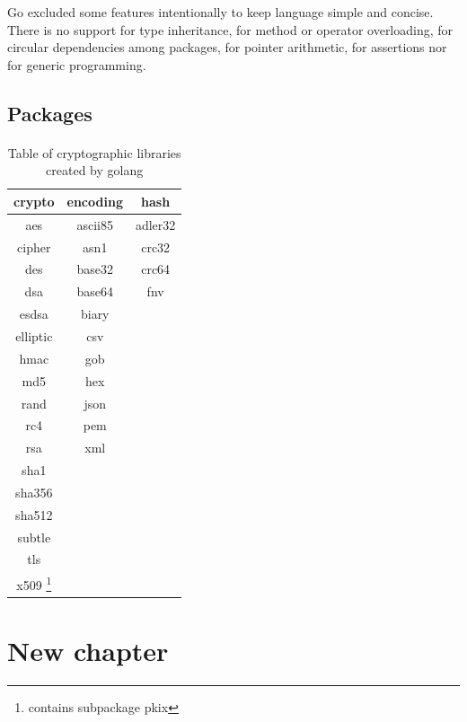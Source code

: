 \documentclass[
  digital, %
  notable,   %
  lof,     %
  lot,     %
]{fithesis3}
\begin{document}
Go excluded some features intentionally to keep language simple and concise. There is no support 
for type inheritance, for method or operator overloading, for circular dependencies among 
packages, for pointer arithmetic, for assertions nor for generic programming.

\section{Packages}

\subsubsection{}

\begin{table}[th]
\begin{tabular}{|c c c|}
\hline
crypto & encoding & hash \\
\hline
aes & ascii85 & adler32 \\
cipher & asn1 & crc32 \\
des & base32 & crc64 \\
dsa & base64 & fnv \\
esdsa & biary &  \\
elliptic & csv &  \\
hmac & gob &  \\
md5 & hex &  \\
rand & json &  \\
rc4 & pem &  \\
rsa & xml &  \\
sha1 &  &  \\
sha356 &  &  \\
sha512 &  &  \\
subtle &  &  \\
tls &  &  \\
x509 \footnote{contains subpackage pkix} &  & \\ 
\hline
\end{tabular}
\caption{Table of cryptographic libraries created by golang} 
\label{table:crypto} 
\end{table}

\chapter{New chapter}
\end{document}
